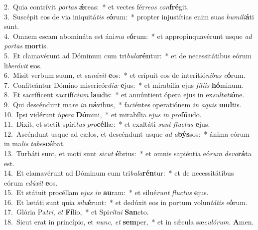 {2.~}Quia contrívit \textit{por}\textit{tas} \textbf{ǽ}reas:~* et vectes fér\textit{re}\textit{os} \textit{con}\textbf{fré}git.\\
{3.~}Suscépit eos de via iniquitá\textit{tis} \textit{e}\textbf{ó}rum:~* propter injustítias enim suas \textit{hu}\textit{mi}\textit{li}\textbf{á}ti sunt.\\
{4.~}Omnem escam abomináta est áni\textit{ma} \textit{e}\textbf{ó}rum:~* et appropinquavérunt usque \textit{ad} \textit{por}\textit{tas} \textbf{mor}tis.\\
{5.~}Et clamavérunt ad Dóminum cum tri\textit{bu}\textit{la}\textbf{rén}tur:~* et de necessitátibus eórum li\textit{be}\textit{rá}\textit{vit} \textbf{e}os.\\
{6.~}Misit verbum suum, et sa\textit{ná}\textit{vit} \textbf{e}os:~* et erípuit eos de interitió\textit{ni}\textit{bus} \textit{e}\textbf{ó}rum.\\
{7.~}Confiteántur Dómino misericór\textit{di}\textit{æ} \textbf{e}jus:~* et mirabília ejus \textit{fí}\textit{li}\textit{is} \textbf{hó}minum.\\
{8.~}Et sacríficent sacrifí\textit{ci}\textit{um} \textbf{lau}dis:~* et annúntient ópera ejus in ex\textit{sul}\textit{ta}\textit{ti}\textbf{ó}ne.\\
{9.~}Qui descéndunt ma\textit{re} \textit{in} \textbf{ná}vibus,~* faciéntes operatiónem \textit{in} \textit{a}\textit{quis} \textbf{mul}tis.\\
{10.~}Ipsi vidérunt ó\textit{pe}\textit{ra} \textbf{Dó}mini,~* et mirabília e\textit{jus} \textit{in} \textit{pro}\textbf{fún}do.\\
{11.~}Dixit, et stetit spíri\textit{tus} \textit{pro}\textbf{cél}læ:~* et exaltáti \textit{sunt} \textit{flu}\textit{ctus} \textbf{e}jus.\\
{12.~}Ascéndunt usque ad cælos, et descéndunt usque \textit{ad} \textit{a}\textbf{býs}sos:~* ánima eórum in ma\textit{lis} \textit{ta}\textit{be}\textbf{scé}bat.\\
{13.~}Turbáti sunt, et moti sunt \textit{si}\textit{cut} \textbf{é}brius:~* et omnis sapiéntia eó\textit{rum} \textit{de}\textit{vo}\textbf{rá}ta est.\\
{14.~}Et clamavérunt ad Dóminum cum tri\textit{bu}\textit{la}\textbf{rén}tur:~* et de necessitátibus eórum \textit{e}\textit{dú}\textit{xit} \textbf{e}os.\\
{15.~}Et státuit procéllam e\textit{jus} \textit{in} \textbf{au}ram:~* et silué\textit{runt} \textit{flu}\textit{ctus} \textbf{e}jus.\\
{16.~}Et lætáti sunt quia \textit{si}\textit{lu}\textbf{é}runt:~* et dedúxit eos in portum volun\textit{tá}\textit{tis} \textit{e}\textbf{ó}rum.\\
{17.~}Glória Pa\textit{tri}, \textit{et} \textbf{Fí}lio,~* et Spi\textit{rí}\textit{tu}\textit{i} \textbf{San}cto.\\
{18.~}Sicut erat in princípio, et \textit{nunc}, \textit{et} \textbf{sem}per,~* et in sǽcula sæ\textit{cu}\textit{ló}\textit{rum}. \textbf{A}men.\\
